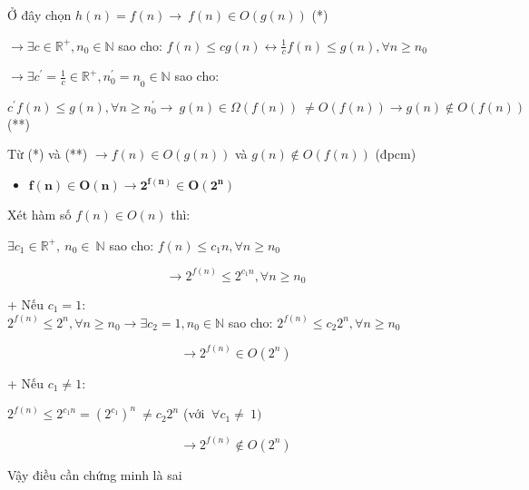 Ở đây chọn \(h(n) = f(n) \rightarrow \ f(n) \in O\left( g(n) \right)\)
(*)

\(\mathbf{\rightarrow}\mathbf{\exists}c \in \mathbb{R}^{+},n_{0} \in \mathbb{N}\) sao cho:
\(f(n) \leq cg(n) \leftrightarrow \frac{1}{c}f(n) \leq g(n),\forall n \geq n_{0}\)

\(\mathbf{\rightarrow}\mathbf{\exists}c^{'} = \frac{1}{c} \in \mathbb{R}^{+},{n_{0}^{'} = n}_{0} \in \mathbb{N}\)
sao cho:

\(c^{'}f(n) \leq g(n),\forall n \geq n_{0}^{'} \rightarrow \ g(n) \in \Omega\left( f(n) \right)\  \neq O\left( f(n) \right) \rightarrow g(n) \notin O\left( f(n) \right)\)(**)

Từ (*) và (**) \(\rightarrow f(n) \in O\left( g(n) \right)\) và
\(g(n) \notin O\left( f(n) \right)\) (đpcm)

\begin{itemize}
\item
  \(\mathbf{f}\left( \mathbf{n} \right)\mathbf{\in O}\left( \mathbf{n} \right)\mathbf{\rightarrow}\mathbf{2}^{\mathbf{f}\left( \mathbf{n} \right)}\mathbf{\in O}\left( \mathbf{2}^{\mathbf{n}} \right)\)
\end{itemize}

Xét hàm số \(f(n) \in O(n)\) thì:

\(\exists c_{1} \in \mathbb{R}^{+},\ n_{0} \in \ \mathbb{N}\) sao cho:
\(f(n) \leq c_{1}n,\forall n \geq n_{0}\)

\[\rightarrow 2^{f(n)} \leq 2^{c_{1}n},\forall n \geq n_{0}\]

+ Nếu \(c_{1} = 1:\)\\
\(2^{f(n)} \leq 2^{n},\forall n \geq n_{0} \rightarrow \exists c_{2} = 1,n_{0} \in \mathbb{N}\)
sao cho: \(2^{f(n)} \leq {c_{2}2}^{n},\forall n \geq n_{0}\)

\[\rightarrow 2^{f(n)} \in O\left( 2^{n} \right)\]

+ Nếu \(c_{1} \neq 1:\)

\(2^{f(n)} \leq 2^{c_{1}n} = \left( 2^{c_{1}} \right)^{n}\  \neq {c_{2}2}^{n}\)
(với \(\ \forall c_{1} \neq \ 1)\)

\[\rightarrow 2^{f(n)} \notin O\left( 2^{n} \right)\]

Vậy điều cần chứng minh là sai